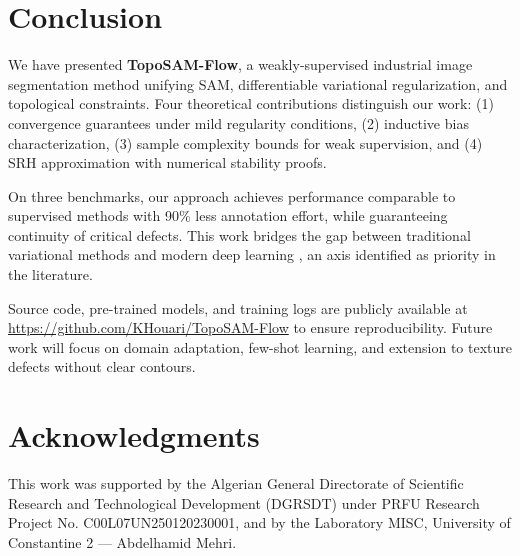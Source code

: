 \documentclass[12pt, a4paper]{article}
\begin{document}
\section{Conclusion}
\label{sec:conclusion}

We have presented \textbf{TopoSAM-Flow}, a weakly-supervised industrial image segmentation method unifying SAM, differentiable variational regularization, and topological constraints. Four theoretical contributions distinguish our work: (1) convergence guarantees under mild regularity conditions, (2) inductive bias characterization, (3) sample complexity bounds for weak supervision, and (4) SRH approximation with numerical stability proofs.

On three benchmarks, our approach achieves performance comparable to supervised methods with 90\% less annotation effort, while guaranteeing continuity of critical defects. This work bridges the gap between traditional variational methods \cite{review2025} and modern deep learning \cite{review2025}, an axis identified as priority in the literature.

Source code, pre-trained models, and training logs are publicly available at \url{https://github.com/KHouari/TopoSAM-Flow} to ensure reproducibility. Future work will focus on domain adaptation, few-shot learning, and extension to texture defects without clear contours.

\section*{Acknowledgments}

This work was supported by the Algerian General Directorate of Scientific Research and Technological Development (DGRSDT) under PRFU Research Project No. C00L07UN250120230001, and by the Laboratory MISC, University of Constantine 2 — Abdelhamid Mehri.
\end{document}
